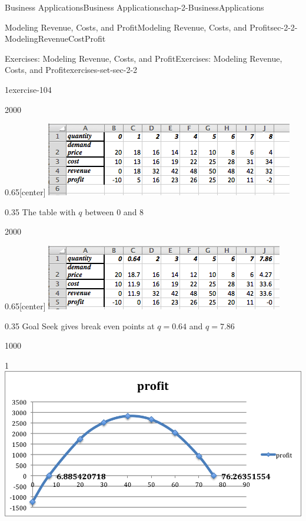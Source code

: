 \documentclass[oneside,10pt,]{book}
\numberwithin{equation}{section}
\begin{document}
\begin{chapterptx}{Business Applications}{}{Business Applications}{}{}{chap-2-BusinessApplications}
\begin{sectionptx}{Modeling Revenue, Costs, and Profit}{}{Modeling Revenue, Costs, and Profit}{}{}{sec-2-2-ModelingRevenueCostProfit}
\begin{exercises-subsection-numberless}{Exercises: Modeling Revenue, Costs, and Profit}{}{Exercises: Modeling Revenue, Costs, and Profit}{}{}{exercises-set-sec-2-2}
\begin{exercisegroup}
\begin{divisionexerciseeg}{1}{}{}{exercise-104}
\begin{enumerate}[label=(\alph*)]
\begin{sidebyside}{2}{0}{0}{0}
\begin{sbspanel}{0.65}[center]%
\includegraphics[width=1\linewidth]{images/sec2-2-sol1c.png}
\end{sbspanel}%
\begin{sbspanel}{0.35}%
\hypertarget{p-695}{}%
The table with \(q\) between 0 and 8%
\end{sbspanel}%
\end{sidebyside}%
\begin{sidebyside}{2}{0}{0}{0}%
\begin{sbspanel}{0.65}[center]%
\includegraphics[width=1\linewidth]{images/sec2-2-sol1d.png}
\end{sbspanel}%
\begin{sbspanel}{0.35}%
\hypertarget{p-696}{}%
Goal Seek gives break even points at \(q = 0.64\) and \(q = 7.86\)%
\end{sbspanel}%
\end{sidebyside}%
\begin{sidebyside}{1}{0}{0}{0}%
\begin{sbspanel}{1}%
\includegraphics[width=1\linewidth]{images/sec2-2-sol1e.png}
\end{sbspanel}%

\end{sidebyside}
\end{enumerate}
\end{divisionexerciseeg}
\end{exercisegroup}
\end{exercises-subsection-numberless}
\end{sectionptx}
\end{chapterptx}
\end{document}
